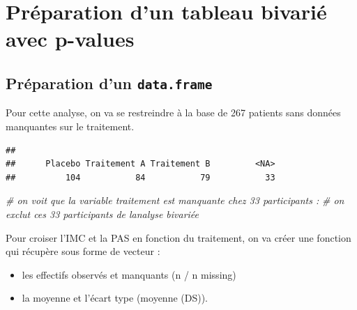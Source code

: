 \documentclass[
]{book}
\newenvironment{Shaded}{\begin{snugshade}}{\end{snugshade}}
\newcommand{\AttributeTok}[1]{\textcolor[rgb]{0.13,0.29,0.53}{#1}}
\newcommand{\CommentTok}[1]{\textcolor[rgb]{0.56,0.35,0.01}{\textit{#1}}}
\newcommand{\FunctionTok}[1]{\textcolor[rgb]{0.13,0.29,0.53}{\textbf{#1}}}
\newcommand{\NormalTok}[1]{#1}
\newcommand{\SpecialCharTok}[1]{\textcolor[rgb]{0.81,0.36,0.00}{\textbf{#1}}}
\newcommand{\StringTok}[1]{\textcolor[rgb]{0.31,0.60,0.02}{#1}}
\providecommand{\tightlist}{%
  \setlength{\itemsep}{0pt}\setlength{\parskip}{0pt}}
\begin{document}
\section{Préparation d'un tableau bivarié avec p-values}\label{pruxe9paration-dun-tableau-bivariuxe9-avec-p-values}

\subsection{\texorpdfstring{Préparation d'un \texttt{data.frame}}{Préparation d'un data.frame}}\label{pruxe9paration-dun-data.frame}

Pour cette analyse, on va se restreindre à la base de 267 patients sans données manquantes sur le traitement.

\begin{Shaded}
\end{Shaded}

\begin{verbatim}
## 
##      Placebo Traitement A Traitement B         <NA> 
##          104           84           79           33
\end{verbatim}

\begin{Shaded}
\begin{Highlighting}[]
\CommentTok{\# on voit que la variable traitement est manquante chez 33 participants :}
\CommentTok{\# on exclut ces 33 participants de l\textquotesingle{}analyse bivariée}
\end{Highlighting}
\end{Shaded}

Pour croiser l'IMC et la PAS en fonction du traitement, on va créer une fonction qui récupère sous forme de vecteur :

\begin{itemize}
\tightlist
\item
  les effectifs observés et manquants (n / n missing)
\item
  la moyenne et l'écart type (moyenne (DS)).
\end{itemize}
\end{document}
